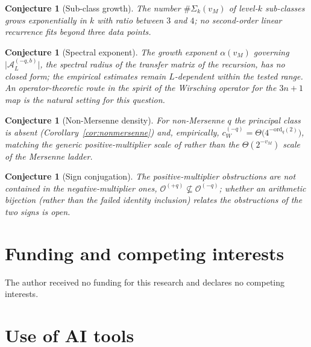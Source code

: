 \documentclass[11pt,reqno]{amsart}
\theoremstyle{plain}
\newtheorem{conjecture}[theorem]{Conjecture}
\theoremstyle{definition}
\theoremstyle{remark}
\newcommand{\Obs}{\mathcal{O}}
\newcommand{\Atom}{\mathcal{A}}
\newcommand{\vM}{v_{M}}
\newcommand{\ord}{\mathrm{ord}}
\newcommand{\cWq}{c_{W}^{(-q)}}
\newcommand{\Atomq}{\Atom_{L}^{(-q,b)}}
\begin{document}
\begin{conjecture}[Sub-class growth]\label{conj:subclass-count}
The number $\#\Sigma_k(\vM)$ of level-$k$ sub-classes grows exponentially in
$k$ with ratio between $3$ and $4$; no second-order linear recurrence fits
beyond three data points.
\end{conjecture}

\begin{conjecture}[Spectral exponent]\label{conj:alpha}
The growth exponent $\alpha(\vM)$ governing $\lvert \Atomq \rvert$, the
spectral radius of the transfer matrix of the recursion, has no closed form;
the empirical estimates remain $L$-dependent within the tested range. An
operator-theoretic route in the spirit of the Wirsching operator for the
$3n+1$ map \cite{Wirsching1998} is the natural setting for this question.
\end{conjecture}

\begin{conjecture}[Non-Mersenne density]\label{conj:nonmersenne}
For non-Mersenne $q$ the principal class is absent
(Corollary~\ref{cor:nonmersenne}) and, empirically,
$\cWq = \Theta\big(4^{-\ord_q(2)}\big)$, matching the generic positive-multiplier
scale of \cite{ObstructionResiduesFamily2026} rather than the
$\Theta(2^{-\vM})$ scale of the Mersenne ladder.
\end{conjecture}

\begin{conjecture}[Sign conjugation]\label{conj:conjugation}
The positive-multiplier obstructions are not contained in the
negative-multiplier ones, $\Obs^{(+q)} \not\subseteq \Obs^{(-q)}$; whether an
arithmetic bijection (rather than the failed identity inclusion) relates the
obstructions of the two signs is open.
\end{conjecture}

\section*{Funding and competing interests}

The author received no funding for this research and declares no competing
interests.

\section*{Use of AI tools}
\end{document}
